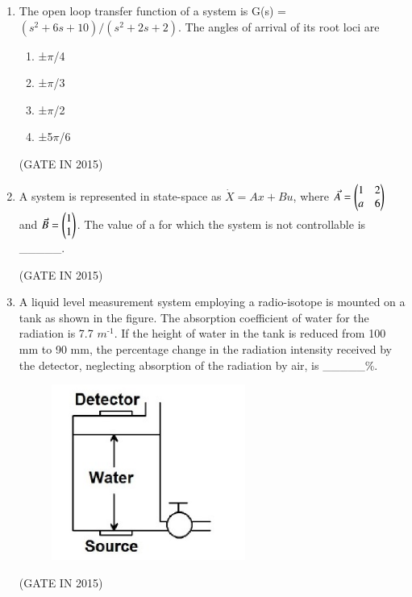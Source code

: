 \documentclass[journal]{IEEEtran}
\begin{document}
\begin{enumerate}
\item The open loop transfer function of a system is G(s) = $(s^2 + 6s + 10)/(s^2 + 2s + 2)$. The angles of arrival of its root loci are

\begin{multicols}{4}
\begin{enumerate}
\item ±$\pi$/4
\item ±$\pi$/3
\item ±$\pi$/2
\item ±5$\pi$/6
\end{enumerate}
\end{multicols} \hfill(GATE IN 2015)

\item A system is represented in state-space as $\dot{X} = Ax + Bu$, where $\Vec{A} = \begin{pmatrix} 1 & 2 \\ a & 6 \end{pmatrix}$ and $\Vec{B} = \begin{pmatrix} 1 \\ 1 \end{pmatrix}$. The value of a for which the system is not controllable is \_\_\_\_\_.

 \hfill(GATE IN 2015)

\item A liquid level measurement system employing a radio-isotope is mounted on a tank as shown in the figure. The absorption coefficient of water for the radiation is 7.7 $m^\text{-1}$. If the height of water in the tank is reduced from 100 mm to 90 mm, the percentage change in the radiation intensity received by the detector, neglecting absorption of the radiation by air, is \_\_\_\_\_\%.
\begin{figure}[H]
    \centering
      \includegraphics[width=0.6\textwidth]{31.png} 
      \caption{}
    \label{fig:fig31} 
\end{figure}
 \hfill(GATE IN 2015)


\end{enumerate}
\end{document}
